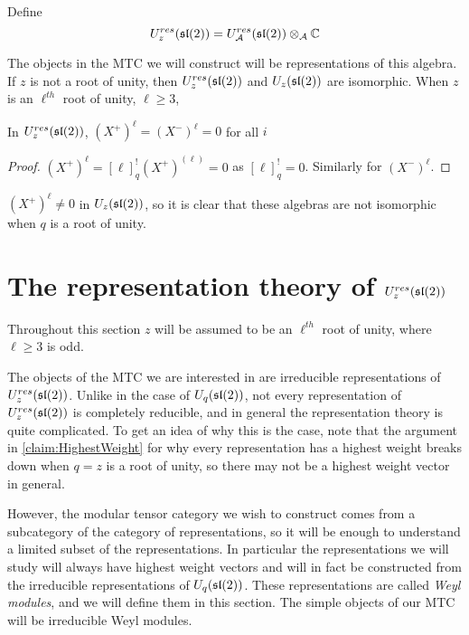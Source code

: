 Define 
\begin{equation}
    U_z^{res}(\mathfrak{sl}(2)) = U_\mathcal{A}^{res}(\mathfrak{sl}(2)) \otimes_\mathcal{A} \mathbb{C}
\end{equation}

The objects in the MTC we will construct will be representations of this
algebra.  If $z$ is not a root of unity, then $U_z^{res}(\mathfrak{sl}(2))$ and
$U_z(\mathfrak{sl}(2))$ are isomorphic. When $z$ is an $\ell^{th}$ root of unity, $\ell
\geq 3$,

\begin{lemma}
    In $U_z^{res}(\mathfrak{sl}(2))$, $ (X^+)^\ell = (X^-)^\ell = 0$ for all $i$
\end{lemma}
\begin{proof}
    $ (X^+)^\ell = [\ell]_{q}^!  (X^+)^{(\ell)} = 0$ as $[\ell]_{q}^! = 0$. Similarly for $(X^-)^\ell$.
\end{proof}

$(X^+)^\ell \neq 0$ in $U_z(\mathfrak{sl}(2))$, so it is clear that these algebras are
not isomorphic when $q$ is a root of unity. 

\section{The representation theory of $U_z^{res}(\mathfrak{sl}(2))$}
\label{section:RepTheoryofResSL2}


Throughout this section $z$ will be assumed to be an $\ell^{th}$ root of unity, where $\ell \geq 3$ is odd.

The objects of the MTC we are interested in are irreducible representations of
$U_z^{res}(\mathfrak{sl}(2))$. Unlike in the case of $U_q(\mathfrak{sl}(2))$, not every
representation of $U_z^{res}(\mathfrak{sl}(2))$ is completely reducible, and in general
the representation theory is quite complicated. To get an idea of why this is
the case, note that the argument in \ref{claim:HighestWeight} for why every
representation has a highest weight breaks down when $q=z$ is a root of unity,
so there may not be a highest weight vector in general. 

However, the modular tensor category we wish to construct comes from a
subcategory of the category of representations, so it will be enough to
understand a limited subset of the representations.  In particular the
representations we will study will always have highest weight vectors and will
in fact be constructed from the irreducible representations of $U_q(\mathfrak{sl}(2))$.
These representations are called  \emph{Weyl modules}, and we will define them
in this section. The simple objects of our MTC will be irreducible Weyl modules. 

